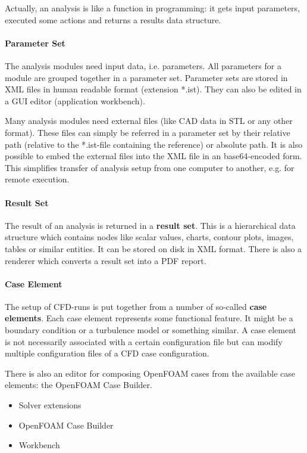 Actually, an analysis is like a function in programming: it gets input parameters, executed some actions and returns a results data structure.

\paragraph{Parameter Set}

The analysis modules need input data, i.e. parameters. All parameters for a module are grouped together in a parameter set. Parameter sets are stored in XML files in human readable format (extension *.ist). They can also be edited in a GUI editor (application workbench).

Many analysis modules need external files (like CAD data in STL or any other format). These files can simply be referred in a parameter set by their relative path (relative to the *.ist-file containing the reference) or absolute path. It is also possible to embed the external files into the XML file in an base64-encoded form. This simplifies transfer of analysis setup from one computer to another, e.g. for remote execution.

\paragraph{Result Set}

The result of an analysis is returned in a \textbf{result set}. This is a hierarchical data structure which contains nodes like scalar values, charts, contour plots, images, tables or similar entities.
It can be stored on disk in XML format.
There is also a renderer which converts a result set into a PDF report.

\paragraph{Case Element}

The setup of CFD-runs is put together from a number of so-called \textbf{case elements}. Each case element represents some functional feature. It might be a boundary condition or a turbulence model or something similar. A case element is not necessarily associated with a certain configuration file but can modify multiple configuration files of a CFD case configuration.

There is also an editor for composing OpenFOAM cases from the available case elements: the OpenFOAM Case Builder.


\begin{itemize}
\item Solver extensions
\item OpenFOAM Case Builder
\item Workbench
\end{itemize}


